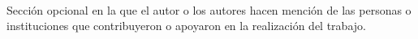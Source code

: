 \null{}

 \\

Sección opcional en la que el autor o los autores hacen mención de las personas o instituciones que contribuyeron o apoyaron en la realización del trabajo. 


\null
\newpage